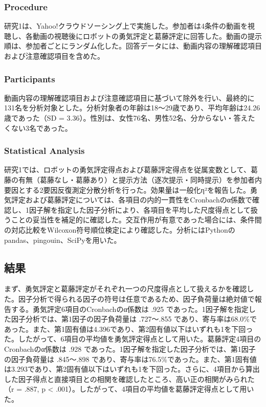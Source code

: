 \documentclass[utf8]{FrontiersinHarvard}
\begin{document}
\subsubsection{Procedure}

研究1は、Yahoo!クラウドソーシング上で実施した。参加者は4条件の動画を視聴し、各動画の視聴後にロボットの勇気評定と葛藤評定に回答した。動画の提示順は、参加者ごとにランダム化した。回答データには、動画内容の理解確認項目および注意確認項目を含めた。

\subsubsection{Participants}

動画内容の理解確認項目および注意確認項目に基づいて除外を行い、最終的に131名を分析対象とした。分析対象者の年齢は18〜29歳であり、平均年齢は24.26歳であった（SD = 3.36）。性別は、女性76名、男性52名、分からない・答えたくない3名であった。

\subsubsection{Statistical Analysis}

研究1では、ロボットの勇気評定得点および葛藤評定得点を従属変数として、葛藤の有無（葛藤なし・葛藤あり）と提示方法（逐次提示・同時提示）を参加者内要因とする2要因反復測定分散分析を行った。効果量は一般化η²を報告した。勇気評定および葛藤評定については、各項目の内的一貫性をCronbachのα係数で確認し、1因子解を指定した因子分析により、各項目を平均した尺度得点として扱うことの妥当性を補足的に確認した。交互作用が有意であった場合には、条件間の対応比較をWilcoxon符号順位検定により確認した。分析にはPythonのpandas、pingouin、SciPyを用いた。

\subsection{結果}

まず、勇気評定と葛藤評定がそれぞれ一つの尺度得点として扱えるかを確認した。因子分析で得られる因子の符号は任意であるため、因子負荷量は絶対値で報告する。勇気評定6項目のCronbachのα係数は .925 であった。1因子解を指定した因子分析では、第1因子の因子負荷量は .727〜.855 であり、寄与率は68.0\%であった。また、第1固有値は4.396であり、第2固有値以下はいずれも1を下回った。したがって、6項目の平均値を勇気評定得点として用いた。葛藤評定4項目のCronbachのα係数は .928 であった。1因子解を指定した因子分析では、第1因子の因子負荷量は .845〜.898 であり、寄与率は76.5\%であった。また、第1固有値は3.293であり、第2固有値以下はいずれも1を下回った。さらに、4項目から算出した因子得点と直接項目との相関を確認したところ、高い正の相関がみられた（r = .887, p \textless{} .001）。したがって、4項目の平均値を葛藤評定得点として用いた。
\end{document}
